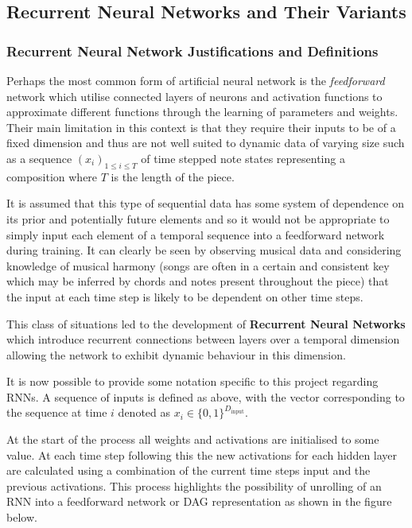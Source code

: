 \documentclass[12pt,]{article}
\begin{document}
\hypertarget{recurrent-neural-networks-and-their-variants}{%
\subsection{Recurrent Neural Networks and Their
Variants}\label{recurrent-neural-networks-and-their-variants}}

\hypertarget{recurrent-neural-network-justifications-and-definitions}{%
\subsubsection{Recurrent Neural Network Justifications and
Definitions}\label{recurrent-neural-network-justifications-and-definitions}}

Perhaps the most common form of artificial neural network is the
\emph{feedforward} network which utilise connected layers of neurons and
activation functions to approximate different functions through the
learning of parameters and weights. Their main limitation in this
context is that they require their inputs to be of a fixed dimension and
thus are not well suited to dynamic data of varying size such as a
sequence \((x_i)_{1\le i\le T}\) of time stepped note states
representing a composition where \(T\) is the length of the piece.

It is assumed that this type of sequential data has some system of
dependence on its prior and potentially future elements and so it would
not be appropriate to simply input each element of a temporal sequence
into a feedforward network during training. It can clearly be seen by
observing musical data and considering knowledge of musical harmony
(songs are often in a certain and consistent key which may be inferred
by chords and notes present throughout the piece) that the input at each
time step is likely to be dependent on other time steps.

This class of situations led to the development of \textbf{Recurrent
Neural Networks} which introduce recurrent connections between layers
over a temporal dimension allowing the network to exhibit dynamic
behaviour in this dimension.

It is now possible to provide some notation specific to this project
regarding RNNs. A sequence of inputs is defined as above, with the
vector corresponding to the sequence at time \(i\) denoted as
\(x_i\in \{0,1\}^{D_{\text{input}}}\).

At the start of the process all weights and activations are initialised
to some value. At each time step following this the new activations for
each hidden layer are calculated using a combination of the current time
steps input and the previous activations. This process highlights the
possibility of unrolling of an RNN into a feedforward network or DAG
representation as shown in the figure below.
\end{document}
